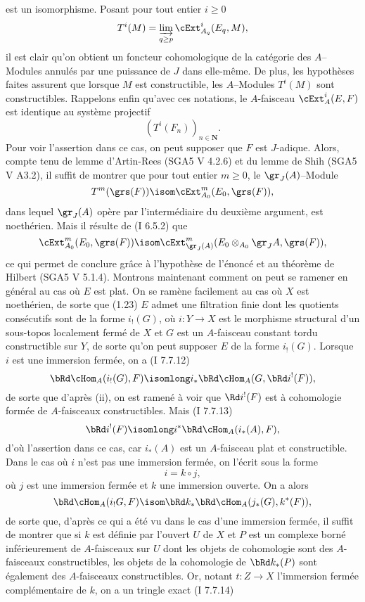 est un isomorphisme. Posant pour tout entier $i \geq 0$
$$
T^i(M) = \varinjlim_{q \geq p}\cExt^i_{A_q}(E_q, M),
$$
il est clair qu'on obtient un foncteur cohomologique de la catégorie des $A$--Modules annulés par une puissance de $J$ dans elle-même. De plus, les hypothèses faites assurent que lorsque $M$ est constructible, les $A$--Modules $T^i(M)$ sont constructibles. Rappelons enfin qu'avec ces notations, le $A$-faisceau $\cExt^i_A(E, F)$ est identique au système projectif
$$
(T^i(F_n))_{n \in \mathbf{N}}.
$$
Pour voir l'assertion dans ce cas, on peut supposer que $F$ est $J$-adique. Alors, compte tenu de lemme d'Artin-Rees (SGA5 V 4.2.6) et du lemme de Shih (SGA5 V A3.2), il suffit de montrer que pour tout entier $m \geq 0$, le $\gr_J(A)$--Module
$$
T^m(\grs(F)) \isom \cExt^m_{A_0}(E_0, \grs(F)),
$$
dans lequel $\gr_J(A)$ opère par l'intermédiaire du deuxième argument, est noethérien. Mais il résulte de (I 6.5.2) que 
$$
\cExt^m_{A_0}(E_0, \grs(F)) \isom \cExt^m_{\gr_J(A)}(E_0 \otimes_{A_0}\gr_J A, \grs(F)),
$$
ce qui permet de conclure grâce à l'hypothèse de l'énoncé et au théorème de Hilbert (SGA5 V 5.1.4). Montrons maintenant comment on peut se ramener en général au cas où $E$ est plat. On se ramène facilement au cas où $X$ est noethérien, de sorte que (1.23) $E$ admet une filtration finie dont les quotients consécutifs sont de la forme $i_!(G)$, où $i: Y \to X$ est le morphisme structural d'un sous-topos localement fermé de $X$ et $G$ est un $A$-faisceau constant tordu constructible sur $Y$, de sorte qu'on peut supposer $E$ de la forme $i_!(G)$. Lorsque $i$ est une immersion fermée, on a (I 7.7.12)
$$
\bRd \cHom_A(i_!(G), F) \isomlong i_* \bRd \cHom_A(G, \bRd i^!(F)),
$$
de sorte que d'après (ii), on est ramené à voir que $\Rd i^!(F)$ est à cohomologie formée de $A$-faisceaux constructibles. Mais (I 7.7.13)
$$
\bRd i^!(F) \isomlong i^* \bRd\cHom_A(i_*(A), F),
$$
d'où l'assertion dans ce cas, car $i_*(A)$ est un $A$-faisceau plat et constructible. Dans le cas où $i$ n'est pas une immersion fermée, on l'écrit sous la forme 
$$
i = k \circ j,
$$
où $j$ est une immersion fermée et $k$ une immersion ouverte. On a alors 
$$
\bRd \cHom_A(i_!G, F) \isom \bRd k_* \bRd\cHom_A(j_*(G), k^*(F)),
$$
de sorte que, d'après ce qui a été vu dans le cas d'une immersion fermée, il suffit de montrer que si $k$ est définie par l'ouvert $U$ de $X$ et $P$ est un complexe borné inférieurement de $A$-faisceaux sur $U$ dont les objets de cohomologie sont des $A$-faisceaux constructibles, les objets de la cohomologie de $\bRd k_*(P)$ sont également des $A$-faisceaux constructibles. Or, notant $t: Z \to X$ l'immersion fermée complémentaire de $k$, on a un tringle exact (I 7.7.14)
